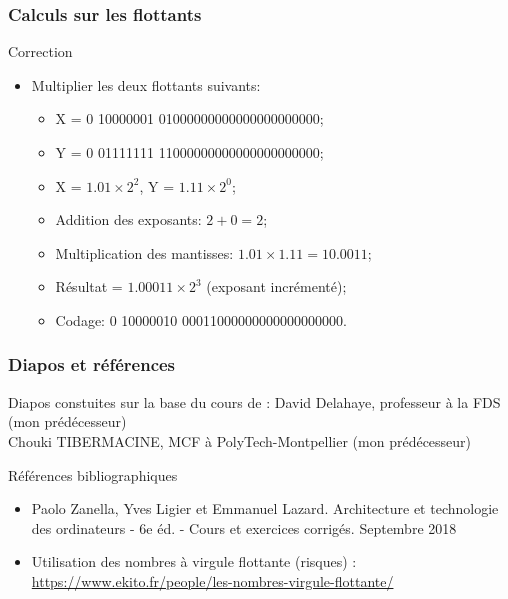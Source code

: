 \documentclass{beamer}
\begin{document}
\begin{frame}
	\frametitle{Calculs sur les flottants}
	
	\begin{block}{Correction}
		\begin{itemize}
			\item Multiplier les deux flottants suivants:
			\begin{itemize}
				\item X = 0 10000001 01000000000000000000000;
				\item Y = 0 01111111 11000000000000000000000;
				\item X = $1.01\times{}2^2$, Y = $1.11\times{}2^0$;
				\item Addition des exposants: $2+0=2$;
				\item Multiplication des mantisses: $1.01\times{}1.11=10.0011$;
				\item Résultat = $1.00011\times{}2^3$ (exposant incrémenté);
				\item Codage: 0 10000010 00011000000000000000000.
			\end{itemize}
		\end{itemize}
	\end{block}
\end{frame}





\begin{frame}
\frametitle{Diapos et références}

\begin{block}{Diapos constuites sur la base du cours de :}
	  David Delahaye, professeur à la FDS (mon prédécesseur)
	\\Chouki TIBERMACINE, MCF à  PolyTech-Montpellier (mon prédécesseur)
\end{block}

\begin{block}{Références bibliographiques}
\begin{itemize}
\item Paolo Zanella, Yves Ligier et Emmanuel Lazard. Architecture et
  technologie des ordinateurs - 6e éd. - Cours et exercices
  corrigés. Septembre 2018
\item Utilisation des nombres à virgule flottante (risques) :\\
  \footnotesize
  \url{https://www.ekito.fr/people/les-nombres-virgule-flottante/}
  \normalsize
\end{itemize}
\end{block}

\end{frame}
\end{document}
